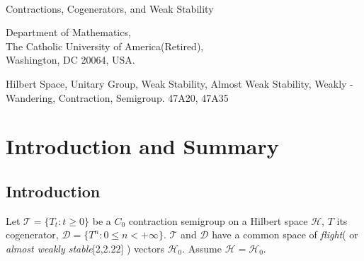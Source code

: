 \documentclass[req no]{amsart}[16pt]
\theoremstyle{plain}
\theoremstyle{definition}
\numberwithin{equation}{section}\setcounter{page}{1}
\def\D{\displaystyle}
\def\O{\Omega}
\def\D{\mathcal{D}}
\def\h{\mathcal{H}}
\def\T {\mathcal{T}}
\def\M {\mathcal{M}}
\begin{document}
\thispagestyle{empty} \setcounter{page}{1}


\begin{title}{\mbox{}\\
[1cm]Contractions, Cogenerators, and Weak Stability}
\author{Robert O'Brien}
\end{title}


\vspace{.2cm}

\maketitle \thispagestyle{empty}

\vspace{-.2cm}
\begin{center}
Department of Mathematics,\\ The Catholic University of America(Retired),\\
Washington, DC 20064, USA.\\
\end{center}


 Hilbert Space, Unitary Group, Weak
Stability, Almost Weak Stability, Weakly - Wandering, Contraction, Semigroup.  47A20, 47A35

\begin{abstract} A $C_{0}$ contraction semigroup $\mathcal{T}$ on a Hilbert space $\h$ and its cogenerator $T$ define a $W^{*} - algebra, ~\M^{\O}$ - the \emph{limit algebra} - which determines the structure of the subspace of \emph{weakly Poisson recurrent (wPr)} vectors and gives a necessary and sufficient condition for $\mathcal{T}$ and $T$ to be \emph{weakly stable equivalent}.
\end{abstract}


\section{Introduction and Summary}
\subsection{Introduction}
Let $\mathcal{T} =\{T_{t}:t \geq 0\}$ be a $C_{0}$ contraction semigroup on a Hilbert space $\h$, $T$ its cogenerator, $\mathcal{D} = \{T^{n}:0\leq n<+\infty\}$. $\T$ and $\D$ have a common space of \emph{flight}( or \emph{almost weakly stable}[2,2.22] ) vectors $\h_{0}$. Assume $\h = \h_{0}$.
\end{document}
